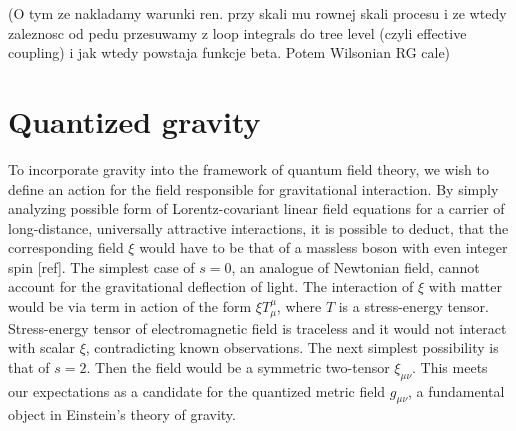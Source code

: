 \documentclass[11pt, a4paper]{article}
\begin{document}
(O tym ze nakladamy warunki ren. przy skali mu rownej skali procesu i ze wtedy
zaleznosc od pedu przesuwamy z loop integrals do tree level (czyli effective coupling) i jak wtedy powstaja funkcje beta. Potem Wilsonian RG cale)


\section{Quantized gravity}

To incorporate gravity into the framework of quantum field theory, %
we wish to define an action for the field responsible for gravitational interaction.
By simply analyzing possible form of Lorentz-covariant linear field equations for a carrier of long-distance, 
universally attractive interactions, it is possible to deduct, that the corresponding field $\xi$ would have to be that of a massless boson with even integer spin [ref].
The simplest case of $s=0$, an analogue of Newtonian field, cannot account for the gravitational deflection of light.
The interaction of $\xi$ with matter would be via term in action of the form $\xi T^\mu_\mu$, where $T$ is a stress-energy tensor.
Stress-energy tensor of electromagnetic field is traceless and it would not interact with scalar $\xi$, contradicting known observations.
The next simplest possibility is that of $s=2$. Then the field would be a symmetric two-tensor $\xi_{\mu\nu}$. This meets our expectations as a
candidate for the quantized metric field $g_{\mu\nu}$, a fundamental object in Einstein's theory of gravity.
\end{document}
